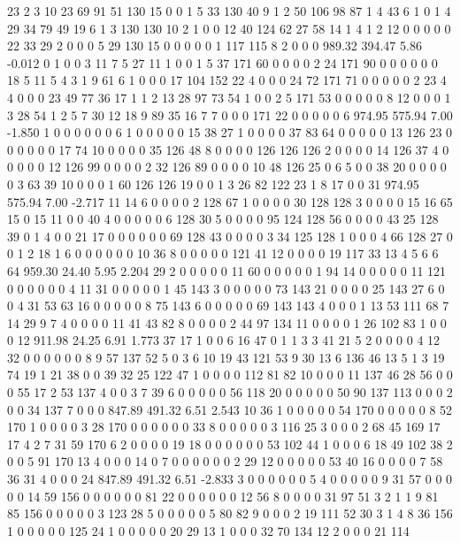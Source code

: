  23 2 3 10 23 69 91 51 130 15 0 0 1 5 33 130 40 9 1 2
 50 106 98 87 1 4 43 6 1 0 1 4 29 34 79 49 19 6 1 3
 130 130 10 2 1 0 0 12 40 124 62 27 58 14 1 4 1 2 12 0
 0 0 0 0 22 33 29 2 0 0 0 5 29 130 15 0 0 0 0 0
 1 117 115 8 2 0 0 0
989.32 394.47 5.86 -0.012
 0 1 0 0 3 11 7 5 27 11 1 0 0 1 5 37 171 60 0 0
 0 0 2 24 171 90 0 0 0 0 0 0 18 5 11 5 4 3 1 9
 61 6 1 0 0 0 17 104 152 22 4 0 0 0 24 72 171 71 0 0
 0 0 0 2 23 4 4 0 0 0 23 49 77 36 17 1 1 2 13 28
 97 73 54 1 0 0 2 5 171 53 0 0 0 0 0 8 12 0 0 0
 1 3 28 54 1 2 5 7 30 12 18 9 89 35 16 7 7 0 0 0
 171 22 0 0 0 0 0 6
974.95 575.94 7.00 -1.850
 1 0 0 0 0 0 0 6 1 0 0 0 0 0 15 38 27 1 0 0
 0 0 37 83 64 0 0 0 0 0 13 126 23 0 0 0 0 0 0 17
 74 10 0 0 0 0 35 126 48 8 0 0 0 0 126 126 126 2 0 0
 0 0 14 126 37 4 0 0 0 0 0 12 126 99 0 0 0 0 2 32
 126 89 0 0 0 0 10 48 126 25 0 6 5 0 0 38 20 0 0 0
 0 0 3 63 39 10 0 0 0 1 60 126 126 19 0 0 1 3 26 82
 122 23 1 8 17 0 0 31
974.95 575.94 7.00 -2.717
 11 14 6 0 0 0 0 2 128 67 1 0 0 0 0 30 128 128 3 0
 0 0 0 15 16 65 15 0 15 11 0 0 40 4 0 0 0 0 0 6
 128 30 5 0 0 0 0 95 124 128 56 0 0 0 0 43 25 128 39 0
 1 4 0 0 21 17 0 0 0 0 0 0 69 128 43 0 0 0 0 3
 34 125 128 1 0 0 0 4 66 128 27 0 0 1 2 18 1 6 0 0
 0 0 0 0 10 36 8 0 0 0 0 0 121 41 12 0 0 0 0 19
 117 33 13 4 5 6 6 64
959.30 24.40 5.95 2.204
 29 2 0 0 0 0 0 11 60 0 0 0 0 0 1 94 14 0 0 0
 0 0 11 121 0 0 0 0 0 0 4 11 31 0 0 0 0 0 1 45
 143 3 0 0 0 0 0 73 143 21 0 0 0 0 25 143 27 6 0 0
 4 31 53 63 16 0 0 0 0 0 8 75 143 6 0 0 0 0 0 69
 143 143 4 0 0 0 1 13 53 111 68 7 14 29 9 7 4 0 0 0
 0 11 41 43 82 8 0 0 0 0 2 44 97 134 11 0 0 0 0 1
 26 102 83 1 0 0 0 12
911.98 24.25 6.91 1.773
 37 17 1 0 0 6 16 47 0 1 1 3 3 41 21 5 2 0 0 0
 0 4 12 32 0 0 0 0 0 0 8 9 57 137 52 5 0 3 6 10
 19 43 121 53 9 30 13 6 136 46 13 5 1 3 19 74 19 1 21 38
 0 0 39 32 25 122 47 1 0 0 0 0 112 81 82 10 0 0 0 11
 137 46 28 56 0 0 0 55 17 2 53 137 4 0 0 3 7 39 6 0
 0 0 0 0 56 118 20 0 0 0 0 0 50 90 137 113 0 0 0 2
 0 0 34 137 7 0 0 0
847.89 491.32 6.51 2.543
 10 36 1 0 0 0 0 0 54 170 0 0 0 0 0 8 52 170 1 0
 0 0 0 3 28 170 0 0 0 0 0 0 33 8 0 0 0 0 0 3
 116 25 3 0 0 0 2 68 45 169 17 17 4 2 7 31 59 170 6 2
 0 0 0 0 19 18 0 0 0 0 0 0 53 102 44 1 0 0 0 6
 18 49 102 38 2 0 0 5 91 170 13 4 0 0 0 14 0 7 0 0
 0 0 0 0 2 29 12 0 0 0 0 0 53 40 16 0 0 0 0 7
 58 36 31 4 0 0 0 24
847.89 491.32 6.51 -2.833
 3 0 0 0 0 0 0 5 4 0 0 0 0 0 9 31 57 0 0 0
 0 0 14 59 156 0 0 0 0 0 0 81 22 0 0 0 0 0 0 12
 56 8 0 0 0 0 31 97 51 3 2 1 1 9 81 85 156 0 0 0
 0 0 3 123 28 5 0 0 0 0 0 5 80 82 9 0 0 0 2 19
 111 52 30 3 1 4 8 36 156 1 0 0 0 0 0 125 24 1 0 0
 0 0 0 20 29 13 1 0 0 0 32 70 134 12 2 0 0 0 21 114
